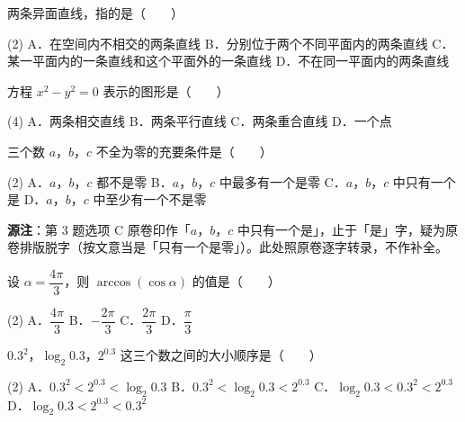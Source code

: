 \begin{question}
两条异面直线，指的是\mbox{（　　）}

\begin{gkopts}(2)
\task A．在空间内不相交的两条直线
\task B．分别位于两个不同平面内的两条直线
\task C．某一平面内的一条直线和这个平面外的一条直线
\task D．不在同一平面内的两条直线
\end{gkopts}

\end{question}
\begin{question}
方程 $x^2-y^2=0$ 表示的图形是\mbox{（　　）}

\begin{gkopts}(4)
\task A．两条相交直线
\task B．两条平行直线
\task C．两条重合直线
\task D．一个点
\end{gkopts}

\end{question}
\begin{question}
三个数 $a$，$b$，$c$ 不全为零的充要条件是\mbox{（　　）}

\begin{gkopts}(2)
\task A．$a$，$b$，$c$ 都不是零
\task B．$a$，$b$，$c$ 中最多有一个是零
\task C．$a$，$b$，$c$ 中只有一个是
\task D．$a$，$b$，$c$ 中至少有一个不是零
\end{gkopts}

\begin{gktip}
\textbf{源注}：第 3 题选项 C 原卷印作「$a$，$b$，$c$ 中只有一个是」，止于「是」字，疑为原卷排版脱字（按文意当是「只有一个是零」）。此处照原卷逐字转录，不作补全。
\end{gktip}

\end{question}
\begin{question}
设 $\alpha=\dfrac{4\pi}{3}$，则 $\arccos(\cos\alpha)$ 的值是\mbox{（　　）}

\begin{gkopts}(2)
\task A．$\dfrac{4\pi}{3}$
\task B．$-\dfrac{2\pi}{3}$
\task C．$\dfrac{2\pi}{3}$
\task D．$\dfrac{\pi}{3}$
\end{gkopts}

\end{question}
\begin{question}
$0.3^2$，$\log_2 0.3$，$2^{0.3}$ 这三个数之间的大小顺序是\mbox{（　　）}

\begin{gkopts}(2)
\task A．$0.3^2<2^{0.3}<\log_2 0.3$
\task B．$0.3^2<\log_2 0.3<2^{0.3}$
\task C．$\log_2 0.3<0.3^2<2^{0.3}$
\task D．$\log_2 0.3<2^{0.3}<0.3^2$
\end{gkopts}

\end{question}
